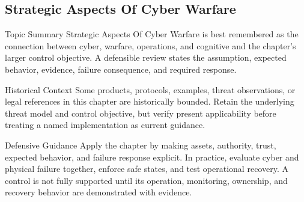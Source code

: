 \documentclass[11pt,letterpaper]{article}
\begin{document}
\subsection*{Strategic Aspects Of Cyber Warfare}
\begin{CornellNotesTable}
\end{CornellNotesTable}
\begin{CornellSummaryBox}{Topic Summary}
Strategic Aspects Of Cyber Warfare is best remembered as the connection between cyber, warfare, operations, and cognitive and the chapter's larger control objective. A defensible review states the assumption, expected behavior, evidence, failure consequence, and required response.
\end{CornellSummaryBox}
\begin{CornellWarningBox}{Historical Context}
Some products, protocols, examples, threat observations, or legal references in this chapter are historically bounded. Retain the underlying threat model and control objective, but verify present applicability before treating a named implementation as current guidance.
\end{CornellWarningBox}
\begin{CornellOverviewBox}{Defensive Guidance}
Apply the chapter by making assets, authority, trust, expected behavior, and failure response explicit. In practice, evaluate cyber and physical failure together, enforce safe states, and test operational recovery. A control is not fully supported until its operation, monitoring, ownership, and recovery behavior are demonstrated with evidence.
\end{CornellOverviewBox}
\end{document}
